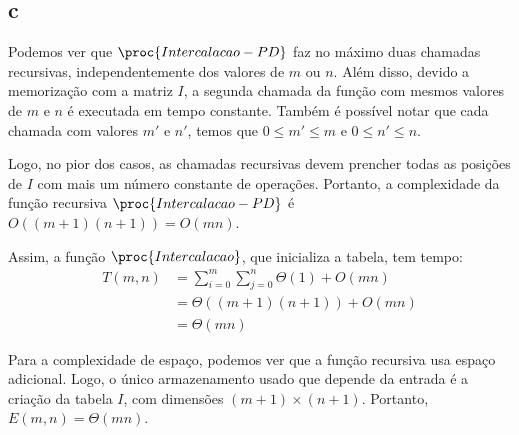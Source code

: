 \itemdsep
\newpage

\subsection{c}

Podemos ver que $\proc{Intercalacao-PD}$ faz no máximo duas chamadas recursivas, independentemente dos valores de $m$ ou $n$. Além disso, devido a memorização com a matriz $I$, a segunda chamada da função com mesmos valores de $m$ e $n$ é executada em tempo constante. Também é possível notar que cada chamada com valores $m'$ e $n'$, temos que $0 \leq m' \leq m$ e $0 \leq n' \leq n$.

Logo, no pior dos casos, as chamadas recursivas devem prencher todas as posições de $I$ com mais um número constante de operações. Portanto, a complexidade da função recursiva $\proc{Intercalacao-PD}$ é $O\left((m + 1) (n + 1)\right) = O(m n)$.

Assim, a função $\proc{Intercalacao}$, que inicializa a tabela, tem tempo:
\begin{align*}
    T(m, n) &= \sum_{i = 0}^m \sum_{j = 0}^n \Theta(1) + O(m n) \\
        &= \Theta((m + 1) (n + 1)) + O(m n) \\
        &= \Theta(m n)
\end{align*}

Para a complexidade de espaço, podemos ver que a função recursiva usa espaço adicional. Logo, o único armazenamento usado que depende da entrada é a criação da tabela $I$, com dimensões $(m + 1) \times (n + 1)$. Portanto, $E(m, n) = \Theta(m n)$.

